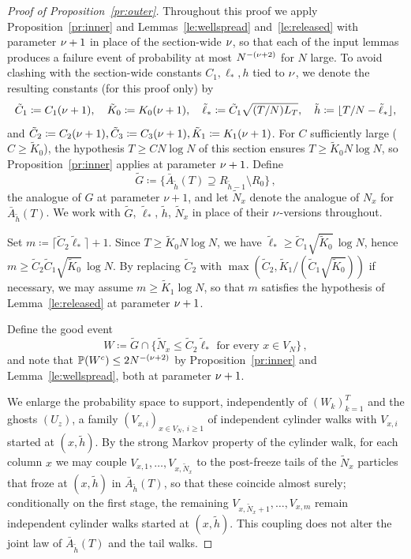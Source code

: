 \documentclass[11pt,a4paper,reqno]{amsart}
\theoremstyle{definition}
\newcommand{\bbP}{{\ensuremath{\mathbb P}} }
\begin{document}
\begin{proof}[Proof of Proposition~\ref{pr:outer}]
Throughout this proof we apply Proposition~\ref{pr:inner} and Lemmas~\ref{le:wellspread} and~\ref{le:released} with parameter $\nu + 1$ in place of the section-wide $\nu$, so that each of the input lemmas produces a failure event of probability at most $N^{-(\nu + 2)}$ for $N$ large. To avoid clashing with the section-wide constants $C_1, \ell_*, h$ tied to $\nu$, we denote the resulting constants (for this proof only) by
\[
  \tilde C_1 \coloneqq C_1(\nu + 1),\quad
  \tilde K_0 \coloneqq K_0(\nu + 1),\quad
  \tilde\ell_* \coloneqq \tilde C_1 \sqrt{(T/N) L_T},\quad
  \tilde h \coloneqq \lfloor T/N - \tilde\ell_*\rfloor,
\]
and $\tilde C_2 \coloneqq C_2(\nu + 1), \tilde C_3 \coloneqq C_3(\nu + 1), \tilde K_1 \coloneqq K_1(\nu + 1)$. For $C$ sufficiently large ($C \geq \tilde K_0$), the hypothesis $T \geq C N\log N$ of this section ensures $T \geq \tilde K_0 N\log N$, so Proposition~\ref{pr:inner} applies at parameter $\nu+1$. Define
	\[ \tilde G \coloneqq \{\bar A_{\tilde h}(T) \supseteq R_{\tilde h - 1} \setminus R_0\}\,, \]
the analogue of $G$ at parameter $\nu+1$, and let $\tilde N_x$ denote the analogue of $N_x$ for $\bar A_{\tilde h}(T)$. We work with $\tilde G$, $\tilde\ell_*$, $\tilde h$, $\tilde N_x$ in place of their $\nu$-versions throughout.

Set $m \coloneqq \lceil \tilde C_2 \tilde\ell_* \rceil + 1$. Since $T \geq \tilde K_0 N\log N$, we have
$\tilde\ell_* \geq \tilde C_1 \sqrt{\tilde K_0}\,\log N$,
hence $m \geq \tilde C_2 \tilde C_1 \sqrt{\tilde K_0}\,\log N$. By replacing $\tilde C_2$ with $\max(\tilde C_2, \tilde K_1/(\tilde C_1\sqrt{\tilde K_0}))$ if necessary, we may assume $m \geq \tilde K_1 \log N$, so that $m$ satisfies the hypothesis of Lemma~\ref{le:released} at parameter $\nu + 1$.

Define the good event
	\[ W \coloneqq \tilde G \cap \{ \tilde N_x \leq \tilde C_2 \tilde\ell_* \text{ for every } x \in V_N \}\,, \]
and note that $\bbP(W^c) \leq 2 N^{-(\n + 2)}$ by Proposition~\ref{pr:inner} and Lemma~\ref{le:wellspread}, both at parameter $\nu + 1$.

We enlarge the probability space to support, independently of $(W_k)_{k=1}^T$ and the ghosts $(U_z)$, a family $(V_{x,i})_{x \in V_N,\, i \geq 1}$ of independent cylinder walks with $V_{x,i}$ started at $(x, \tilde h)$. By the strong Markov property of the cylinder walk, for each column $x$ we may couple $V_{x, 1}, \ldots, V_{x, \tilde N_x}$ to the post-freeze tails of the $\tilde N_x$ particles that froze at $(x, \tilde h)$ in $\bar A_{\tilde h}(T)$, so that these coincide almost surely; conditionally on the first stage, the remaining $V_{x, \tilde N_x + 1}, \ldots, V_{x, m}$ remain independent cylinder walks started at $(x, \tilde h)$. This coupling does not alter the joint law of $\bar A_{\tilde h}(T)$ and the tail walks.


\end{proof}
\end{document}
